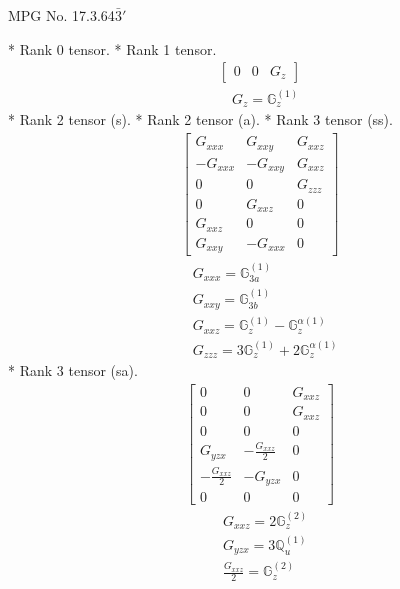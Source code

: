 \documentclass[fleqn,8pt,landscape]{jsarticle}
\begin{document}
\setcounter{MaxMatrixCols}{32}

\renewcommand{\tablename}{Table~}
\renewcommand{\figurename}{Figure~}
\begin{center}
\LARGE
MPG No. 17.3.64\quad$\bar{3}'$
\end{center}
* Rank 0 tensor.
* Rank 1 tensor.
\begin{align*}
\begin{bmatrix} 0 & 0 & G_{z} \end{bmatrix}
\end{align*}
\begin{align*}
& G_{z} = \mathbb{G}_{z}^{(1)}
\end{align*}
* Rank 2 tensor (s).
* Rank 2 tensor (a).
* Rank 3 tensor (ss).
\begin{align*}
\begin{bmatrix} G_{xxx} & G_{xxy} & G_{xxz} \\ - G_{xxx} & - G_{xxy} & G_{xxz} \\ 0 & 0 & G_{zzz} \\ 0 & G_{xxz} & 0 \\ G_{xxz} & 0 & 0 \\ G_{xxy} & - G_{xxx} & 0 \end{bmatrix}
\end{align*}
\begin{align*}
& G_{xxx} = \mathbb{G}_{3a}^{(1)} \\
& G_{xxy} = \mathbb{G}_{3b}^{(1)} \\
& G_{xxz} = \mathbb{G}_{z}^{(1)} - \mathbb{G}_{z}^{\alpha(1)} \\
& G_{zzz} = 3 \mathbb{G}_{z}^{(1)} + 2 \mathbb{G}_{z}^{\alpha(1)}
\end{align*}
* Rank 3 tensor (sa).
\begin{align*}
\begin{bmatrix} 0 & 0 & G_{xxz} \\ 0 & 0 & G_{xxz} \\ 0 & 0 & 0 \\ G_{yzx} & - \frac{G_{xxz}}{2} & 0 \\ - \frac{G_{xxz}}{2} & - G_{yzx} & 0 \\ 0 & 0 & 0 \end{bmatrix}
\end{align*}
\begin{align*}
& G_{xxz} = 2 \mathbb{G}_{z}^{(2)} \\
& G_{yzx} = 3 \mathbb{Q}_{u}^{(1)} \\
& \frac{G_{xxz}}{2} = \mathbb{G}_{z}^{(2)}
\end{align*}
\end{document}
